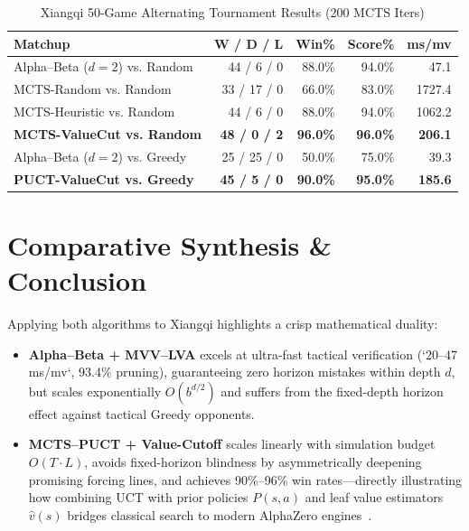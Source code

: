 \documentclass[conference]{IEEEtran}
\begin{document}
\begin{table}[t]
\centering
\caption{Xiangqi 50-Game Alternating Tournament Results (200 MCTS Iters)}
\label{tab:xq_mcts}
\begin{tabular}{@{}lrrrr@{}}
\toprule
\textbf{Matchup} & \textbf{W / D / L} & \textbf{Win\%} & \textbf{Score\%} & \textbf{ms/mv} \\
\midrule
Alpha--Beta ($d{=}2$) vs. Random & 44 / 6 / 0 & 88.0\% & 94.0\% & 47.1 \\
MCTS-Random vs. Random & 33 / 17 / 0 & 66.0\% & 83.0\% & 1727.4 \\
MCTS-Heuristic vs. Random & 44 / 6 / 0 & 88.0\% & 94.0\% & 1062.2 \\
\textbf{MCTS-ValueCut vs. Random} & \textbf{48 / 0 / 2} & \textbf{96.0\%} & \textbf{96.0\%} & \textbf{206.1} \\
\midrule
Alpha--Beta ($d{=}2$) vs. Greedy & 25 / 25 / 0 & 50.0\% & 75.0\% & 39.3 \\
\textbf{PUCT-ValueCut vs. Greedy} & \textbf{45 / 5 / 0} & \textbf{90.0\%} & \textbf{95.0\%} & \textbf{185.6} \\
\bottomrule
\end{tabular}
\end{table}

\section{Comparative Synthesis \& Conclusion}
Applying both algorithms to Xiangqi highlights a crisp mathematical duality:
\begin{itemize}
    \item \textbf{Alpha--Beta + MVV--LVA} excels at ultra-fast tactical verification (`20--47 ms/mv`, 93.4\% pruning), guaranteeing zero horizon mistakes within depth $d$, but scales exponentially $O(b^{d/2})$ and suffers from the fixed-depth horizon effect against tactical Greedy opponents.
    \item \textbf{MCTS--PUCT + Value-Cutoff} scales linearly with simulation budget $O(T \cdot L)$, avoids fixed-horizon blindness by asymmetrically deepening promising forcing lines, and achieves 90\%--96\% win rates---directly illustrating how combining UCT with prior policies $P(s,a)$ and leaf value estimators $\hat{v}(s)$ bridges classical search to modern AlphaZero engines~\cite{silver2017}.
\end{itemize}
\end{document}
